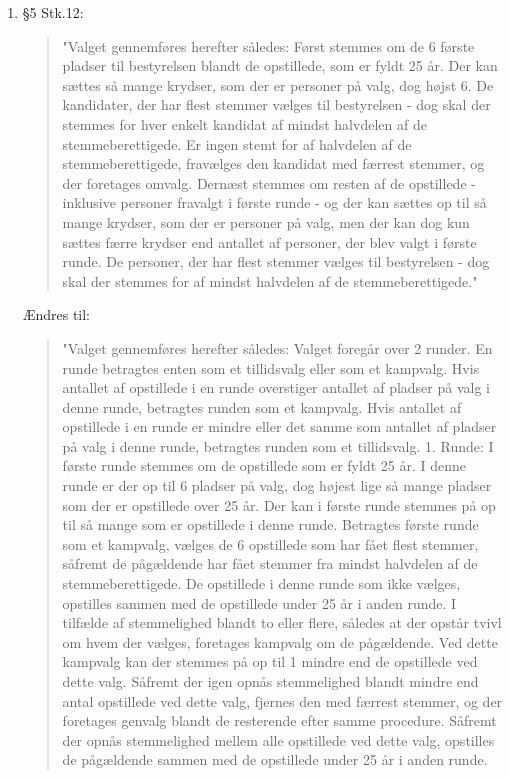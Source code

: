 \documentclass[a4paper,12pt,danish]{article}
\begin{document}
\begin{enumerate}
\item \S5 Stk.12:
    \begin{quote}
"Valget gennemføres herefter således:
Først stemmes om de 6 første pladser til bestyrelsen blandt de opstillede, som er fyldt 25 år. Der kan sættes så mange krydser, som der er personer på valg, dog højst 6. De kandidater, der har flest stemmer vælges til bestyrelsen - dog skal der stemmes for hver enkelt kandidat af mindst halvdelen af de stemmeberettigede. Er ingen stemt for af halvdelen af de stemmeberettigede, fravælges den kandidat med færrest stemmer, og der foretages omvalg.
Dernæst stemmes om resten af de opstillede - inklusive personer fravalgt i første runde - og der kan sættes op til så mange krydser, som der er personer på valg, men der kan dog kun sættes færre krydser end antallet af personer, der blev valgt i første runde. De personer, der har flest stemmer vælges til bestyrelsen - dog skal der stemmes for af mindst halvdelen af de stemmeberettigede."
    \end{quote}
    Ændres til:
    \begin{quote}
"Valget gennemføres herefter således:
Valget foregår over 2 runder. En runde betragtes enten som et tillidsvalg eller som et kampvalg.
Hvis antallet af opstillede i en runde overstiger antallet af pladser på valg i denne runde, betragtes runden som et kampvalg.
Hvis antallet af opstillede i en runde er mindre eller det samme som antallet af pladser på valg i denne runde, betragtes runden som et tillidsvalg.
1. Runde:
I første runde stemmes om de opstillede som er fyldt 25 år. I denne runde er der op til 6 pladser på valg, dog højest lige så mange pladser som der er opstillede over 25 år.
Der kan i første runde stemmes på op til så mange som er opstillede i denne runde.
Betragtes første runde som et kampvalg, vælges de 6 opstillede som har fået flest stemmer, såfremt de pågældende har fået stemmer fra mindst halvdelen af de stemmeberettigede. De opstillede i denne runde som ikke vælges, opstilles sammen med de opstillede under 25 år i anden runde.
I tilfælde af stemmelighed blandt to eller flere, således at der opstår tvivl om hvem der vælges, foretages kampvalg om de pågældende. Ved dette kampvalg kan der stemmes på op til 1 mindre end de opstillede ved dette valg. Såfremt der igen opnås stemmelighed blandt mindre end antal opstillede ved dette valg, fjernes den med færrest stemmer, og der foretages genvalg blandt de resterende efter samme procedure. Såfremt der opnås stemmelighed mellem alle opstillede ved dette valg, opstilles de pågældende sammen med de opstillede under 25 år i anden runde.

\end{quote}
\end{enumerate}
\end{document}
